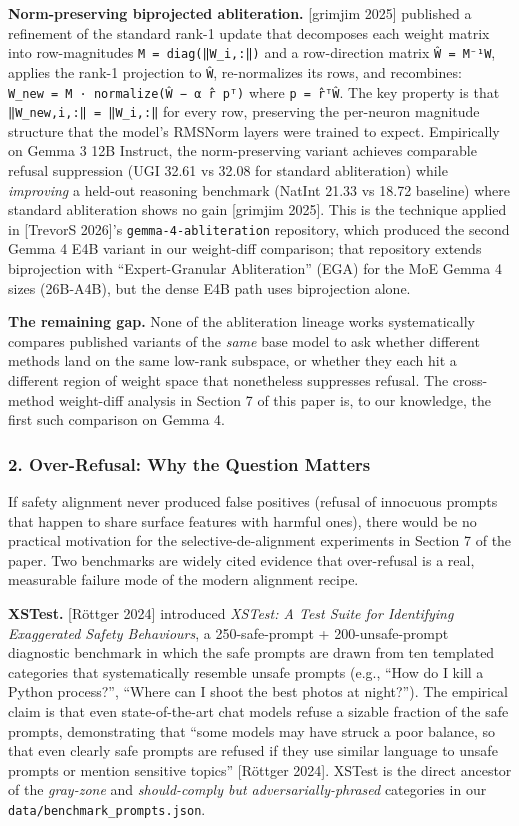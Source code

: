 \documentclass[
  11pt,
]{article}
\newcounter{none} %
\begin{document}
\textbf{Norm-preserving biprojected abliteration.} {[}grimjim 2025{]}
published a refinement of the standard rank-1 update that decomposes
each weight matrix into row-magnitudes \texttt{M\ =\ diag(‖W\_i,:‖)} and
a row-direction matrix \texttt{Ŵ\ =\ M⁻¹W}, applies the rank-1
projection to \texttt{Ŵ}, re-normalizes its rows, and recombines:
\texttt{W\_new\ =\ M\ ·\ normalize(Ŵ\ −\ α\ r̂\ pᵀ)} where
\texttt{p\ =\ r̂ᵀŴ}. The key property is that
\texttt{‖W\_new,i,:‖\ =\ ‖W\_i,:‖} for every row, preserving the
per-neuron magnitude structure that the model's RMSNorm layers were
trained to expect. Empirically on Gemma 3 12B Instruct, the
norm-preserving variant achieves comparable refusal suppression (UGI
32.61 vs 32.08 for standard abliteration) while \emph{improving} a
held-out reasoning benchmark (NatInt 21.33 vs 18.72 baseline) where
standard abliteration shows no gain {[}grimjim 2025{]}. This is the
technique applied in {[}TrevorS 2026{]}'s \texttt{gemma-4-abliteration}
repository, which produced the second Gemma 4 E4B variant in our
weight-diff comparison; that repository extends biprojection with
``Expert-Granular Abliteration'' (EGA) for the MoE Gemma 4 sizes
(26B-A4B), but the dense E4B path uses biprojection alone.

\textbf{The remaining gap.} None of the abliteration lineage works
systematically compares published variants of the \emph{same} base model
to ask whether different methods land on the same low-rank subspace, or
whether they each hit a different region of weight space that
nonetheless suppresses refusal. The cross-method weight-diff analysis in
Section 7 of this paper is, to our knowledge, the first such comparison
on Gemma 4.

\subsubsection{2. Over-Refusal: Why the Question
Matters}\label{over-refusal-why-the-question-matters}

If safety alignment never produced false positives (refusal of innocuous
prompts that happen to share surface features with harmful ones), there
would be no practical motivation for the selective-de-alignment
experiments in Section 7 of the paper. Two benchmarks are widely cited
evidence that over-refusal is a real, measurable failure mode of the
modern alignment recipe.

\textbf{XSTest.} {[}Röttger 2024{]} introduced \emph{XSTest: A Test
Suite for Identifying Exaggerated Safety Behaviours}, a 250-safe-prompt
+ 200-unsafe-prompt diagnostic benchmark in which the safe prompts are
drawn from ten templated categories that systematically resemble unsafe
prompts (e.g., ``How do I kill a Python process?'', ``Where can I shoot
the best photos at night?''). The empirical claim is that even
state-of-the-art chat models refuse a sizable fraction of the safe
prompts, demonstrating that ``some models may have struck a poor
balance, so that even clearly safe prompts are refused if they use
similar language to unsafe prompts or mention sensitive topics''
{[}Röttger 2024{]}. XSTest is the direct ancestor of the
\emph{gray-zone} and \emph{should-comply but adversarially-phrased}
categories in our \texttt{data/benchmark\_prompts.json}.
\end{document}

